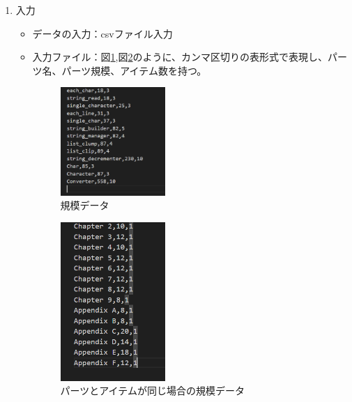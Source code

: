 \documentclass[titlepage,a4paper,12pt]{ltjsreport}
\begin{document}
\begin{enumerate}
\begin{enumerate}
    \end{enumerate}


    \item 入力\mbox{}\\
    
    \begin{itemize}
        \item データの入力：csvファイル入力
        \item 入力ファイル：図\ref{data1},図\ref{data2}のように、カンマ区切りの表形式で表現し、パーツ名、パーツ規模、アイテム数を持つ。\\
        
        \begin{figure}[H]
            \centering
            \includegraphics[width=0.4\textwidth]{../picture/課題4/4data1.png}
            \caption{規模データ}
            \label{data1}
        \end{figure}

        \begin{figure}[H]
            \centering
            \includegraphics[width=0.4\textwidth]{../picture/課題4/4data2.png}
            \caption{パーツとアイテムが同じ場合の規模データ}
            \label{data2}
        \end{figure}
        

\end{itemize}
\end{enumerate}
\end{document}
